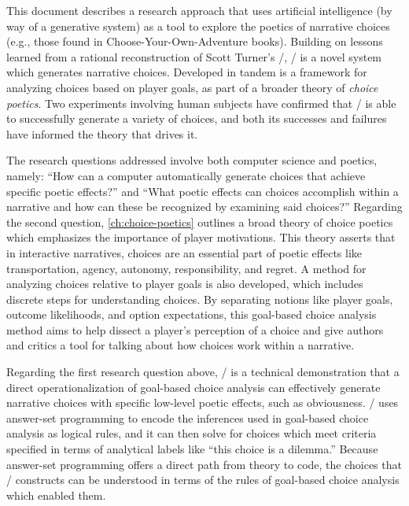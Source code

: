 This document describes a research approach that uses artificial intelligence (by way of a generative system) as a tool to explore the poetics of narrative choices (e.g., those found in Choose-Your-Own-Adventure books).
%
Building on lessons learned from a rational reconstruction of Scott Turner's \minstrel/, \dunyazad/ is a novel system which generates narrative choices.
%
Developed in tandem is a framework for analyzing choices based on player goals, as part of a broader theory of \emph{choice poetics}.
%
Two experiments involving human subjects have confirmed that \dunyazad/ is able to successfully generate a variety of choices, and both its successes and failures have informed the theory that drives it.


The research questions addressed involve both computer science and poetics, namely: ``How can a computer automatically generate choices that achieve specific poetic effects?'' and ``What poetic effects can choices accomplish within a narrative and how can these be recognized by examining said choices?''
%
Regarding the second question, \cref{ch:choice-poetics} outlines a broad theory of choice poetics which emphasizes the importance of player motivations.
%
This theory asserts that in interactive narratives, choices are an essential part of poetic effects like transportation, agency, autonomy, responsibility, and regret.
%
A method for analyzing choices relative to player goals is also developed, which includes discrete steps for understanding choices.
%
By separating notions like player goals, outcome likelihoods, and option expectations, this goal-based choice analysis method aims to help dissect a player's perception of a choice and give authors and critics a tool for talking about how choices work within a narrative.


Regarding the first research question above, \dunyazad/ is a technical demonstration that a direct operationalization of goal-based choice analysis can effectively generate narrative choices with specific low-level poetic effects, such as obviousness.
%
\dunyazad/ uses answer-set programming to encode the inferences used in goal-based choice analysis as logical rules, and it can then solve for choices which meet criteria specified in terms of analytical labels like ``this choice is a dilemma.''
%
Because answer-set programming offers a direct path from theory to code, the choices that \dunyazad/ constructs can be understood in terms of the rules of goal-based choice analysis which enabled them.



